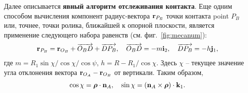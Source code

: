 Далее описывается \textbf{явный алгоритм отслеживания контакта}.
Еще одним способом вычисления компонент радиус-вектора ${\bf r}_{P_B}$ точки контакта point $P_B$ или, точнее, точки ролика, ближайшей к опорной плоскости, является применение следующего набора равенств (см. фиг.~\ref{fig:mecanum}):
$$
{\bf r}_{P_B}={\bf r}_{O_B}+\overrightarrow{O_BD}+\overrightarrow{DP_B},\quad
\overrightarrow{O_BD}=-m{\bf i}_2,\quad\overrightarrow{DP_B}=-h{\bf j}_1,
$$
где $m=R_1\sin\chi / \cos\chi/\cos\psi $, $h=R-R_1/\cos\chi$. Здесь $\chi$ -- текущее значение угла отклонения вектора ${\bf r}_{O_A}-{\bf r}_{O_B}$ от 
вертикали. Таким образом,
$$
\cos\chi=\boldsymbol{\mathbf{\rho}}\cdot{\bf n}_A, \quad \sin\chi=
\left({\bf n}_A\times\boldsymbol{\mathbf{\rho}}\right)\cdot {\bf k}_1.
$$

